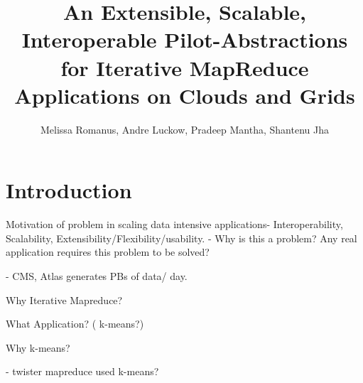 \documentclass[times]{cpeauth}
\begin{document}

\title{An Extensible, Scalable, Interoperable Pilot-Abstractions for Iterative MapReduce Applications on Clouds and Grids}

\author{Melissa Romanus, Andre Luckow, Pradeep Mantha, Shantenu Jha\corrauth}

\address{Radical Research Group, Rutgers University}


\begin{abstract}



\end{abstract}


\maketitle


\vspace{-6pt}

\section{Introduction}
\vspace{-2pt}
Motivation of problem in scaling data intensive applications- Interoperability, 
Scalability, Extensibility/Flexibility/usability.
   - Why is this a problem? Any real application requires this problem to be solved?

   - CMS, Atlas generates PBs of data/ day.

Why Iterative Mapreduce?

What Application?  ( k-means?)

Why k-means?

  - twister mapreduce used k-means?
\end{document}
